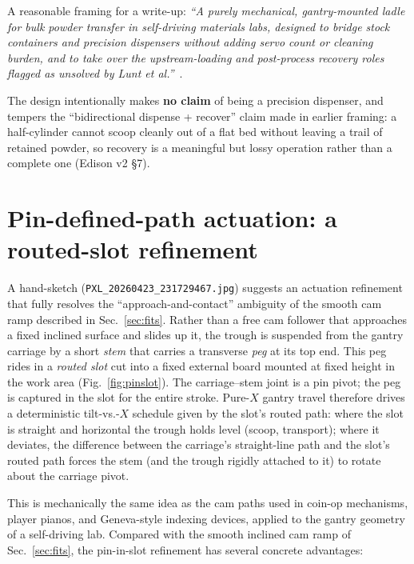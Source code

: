 \documentclass[11pt,a4paper]{article}
\begin{document}
A reasonable framing for a write-up: \emph{``A purely mechanical,
gantry-mounted ladle for bulk powder transfer in self-driving materials
labs, designed to bridge stock containers and precision dispensers without
adding servo count or cleaning burden, and to take over the upstream-loading
and post-process recovery roles flagged as unsolved by Lunt
et al.''}~\cite{lunt2023modularmultirobotintegration,lunt2024aroboticworkflow}.

The design intentionally makes \textbf{no claim} of being a precision
dispenser, and tempers the ``bidirectional dispense + recover'' claim made
in earlier framing: a half-cylinder cannot scoop cleanly out of a flat bed
without leaving a trail of retained powder, so recovery is a meaningful but
lossy operation rather than a complete one (Edison v2 \S7).

\section{Pin-defined-path actuation: a routed-slot refinement}
\label{sec:pinslot}

A hand-sketch (\texttt{PXL\_20260423\_231729467.jpg}) suggests an actuation
refinement that fully resolves the ``approach-and-contact'' ambiguity of
the smooth cam ramp described in Sec.~\ref{sec:fits}. Rather than a free
cam follower that approaches a fixed inclined surface and slides up it, the
trough is suspended from the gantry carriage by a short \emph{stem} that
carries a transverse \emph{peg} at its top end. This peg rides in a
\emph{routed slot} cut into a fixed external board mounted at fixed height
in the work area (Fig.~\ref{fig:pinslot}). The carriage--stem joint is a
pin pivot; the peg is captured in the slot for the entire stroke. Pure-$X$
gantry travel therefore drives a deterministic tilt-vs.-$X$ schedule given
by the slot's routed path: where the slot is straight and horizontal the
trough holds level (scoop, transport); where it deviates, the difference
between the carriage's straight-line path and the slot's routed path forces
the stem (and the trough rigidly attached to it) to rotate about the
carriage pivot.

This is mechanically the same idea as the cam paths used in coin-op
mechanisms, player pianos, and Geneva-style indexing devices, applied to
the gantry geometry of a self-driving lab. Compared with the smooth
inclined cam ramp of Sec.~\ref{sec:fits}, the pin-in-slot refinement has
several concrete advantages:
\end{document}
